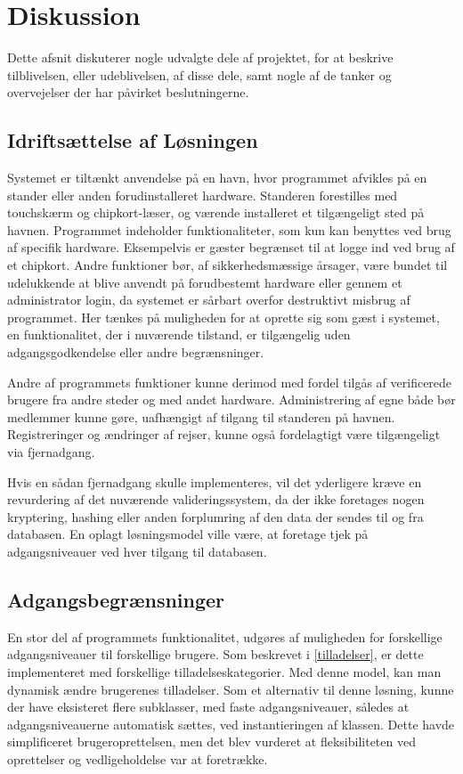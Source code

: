 \chapter{Diskussion}
\label{cha:diskussion}

Dette afsnit diskuterer nogle udvalgte dele af projektet, for at beskrive tilblivelsen, eller udeblivelsen, af disse dele, samt nogle af de tanker og overvejelser der har påvirket beslutningerne.

\section{Idriftsættelse af Løsningen} 

Systemet er tiltænkt anvendelse på en havn, hvor programmet afvikles på en stander eller anden forudinstalleret hardware. Standeren forestilles med touchskærm og chipkort-læser, og værende installeret et tilgængeligt sted på havnen. Programmet indeholder funktionaliteter, som kun kan benyttes ved brug af specifik hardware. Eksempelvis er gæster begrænset til at logge ind ved brug af et chipkort. Andre funktioner bør, af sikkerhedsmæssige årsager, være bundet til udelukkende at blive anvendt på forudbestemt hardware eller gennem et administrator login, da systemet er sårbart overfor destruktivt misbrug af programmet. Her tænkes på muligheden for at oprette sig som gæst i systemet, en funktionalitet, der i nuværende tilstand, er tilgængelig uden adgangsgodkendelse eller andre begrænsninger.

Andre af programmets funktioner kunne derimod med fordel tilgås af verificerede brugere fra andre steder og med andet hardware. Administrering af egne både bør medlemmer kunne gøre, uafhængigt af tilgang til standeren på havnen. Registreringer og ændringer af rejser, kunne også fordelagtigt være tilgængeligt via fjernadgang.

Hvis en sådan fjernadgang skulle implementeres, vil det yderligere kræve en revurdering af det nuværende valideringssystem, da der ikke foretages nogen kryptering, hashing eller anden forplumring af den data der sendes til og fra databasen. En oplagt løsningsmodel ville være, at foretage tjek på adgangsniveauer ved hver tilgang til databasen.

\section{Adgangsbegrænsninger}

En stor del af programmets funktionalitet, udgøres af muligheden for forskellige adgangsniveauer til forskellige brugere. Som beskrevet i \cref{tilladelser}, er dette implementeret med forskellige tilladelseskategorier. Med denne model, kan man dynamisk ændre brugerenes tilladelser. Som et alternativ til denne løsning, kunne der have eksisteret flere subklasser, med faste adgangsniveauer, således at adgangsniveauerne automatisk sættes, ved instantieringen af klassen. Dette havde simplificeret brugeroprettelsen, men det blev vurderet at fleksibiliteten ved oprettelser og vedligeholdelse var at foretrække. 

